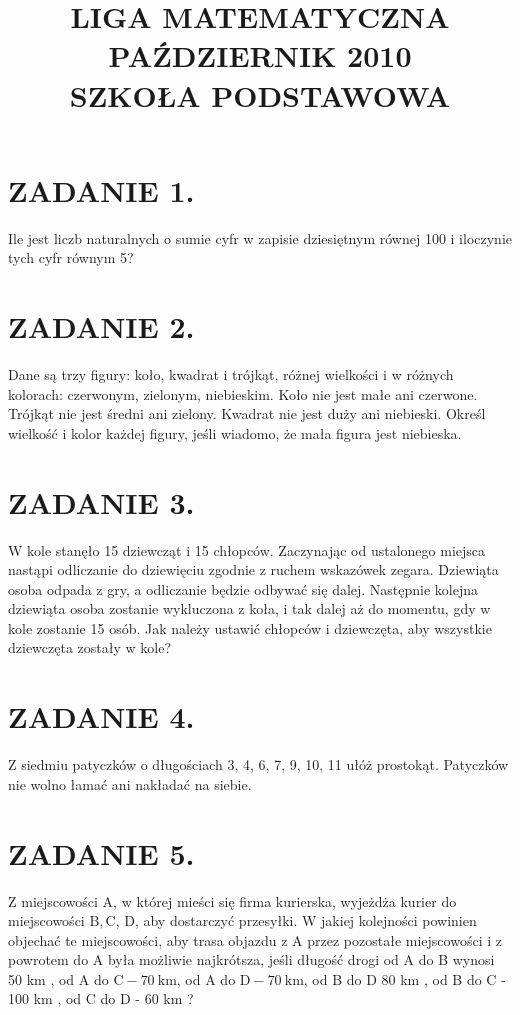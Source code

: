 \documentclass[10pt]{article}
\title{LIGA MATEMATYCZNA \\
 PAŹDZIERNIK 2010 \\
 SZKOŁA PODSTAWOWA }
\author{}
\date{}
\begin{document}
\maketitle
\section*{ZADANIE 1.}
Ile jest liczb naturalnych o sumie cyfr w zapisie dziesiętnym równej 100 i iloczynie tych cyfr równym 5?

\section*{ZADANIE 2.}
Dane są trzy figury: koło, kwadrat i trójkąt, różnej wielkości i w różnych kolorach: czerwonym, zielonym, niebieskim. Koło nie jest małe ani czerwone. Trójkąt nie jest średni ani zielony. Kwadrat nie jest duży ani niebieski. Określ wielkość i kolor każdej figury, jeśli wiadomo, że mała figura jest niebieska.

\section*{ZADANIE 3.}
W kole stanęło 15 dziewcząt i 15 chłopców. Zaczynając od ustalonego miejsca nastąpi odliczanie do dziewięciu zgodnie z ruchem wskazówek zegara. Dziewiąta osoba odpada z gry, a odliczanie będzie odbywać się dalej. Następnie kolejna dziewiąta osoba zostanie wykluczona z koła, i tak dalej aż do momentu, gdy w kole zostanie 15 osób. Jak należy ustawić chłopców i dziewczęta, aby wszystkie dziewczęta zostały w kole?

\section*{ZADANIE 4.}
Z siedmiu patyczków o długościach 3, 4, 6, 7, 9, 10, 11 ułóż prostokąt. Patyczków nie wolno łamać ani nakładać na siebie.

\section*{ZADANIE 5.}
Z miejscowości A, w której mieści się firma kurierska, wyjeżdża kurier do miejscowości \(\mathrm{B}, \mathrm{C}\), D, aby dostarczyć przesyłki. W jakiej kolejności powinien objechać te miejscowości, aby trasa objazdu z A przez pozostałe miejscowości i z powrotem do A była możliwie najkrótsza, jeśli długość drogi od A do B wynosi 50 km , od A do \(\mathrm{C}-70 \mathrm{~km}\), od A do \(\mathrm{D}-70 \mathrm{~km}\), od B do D 80 km , od B do C - 100 km , od C do D - 60 km ?
\end{document}
